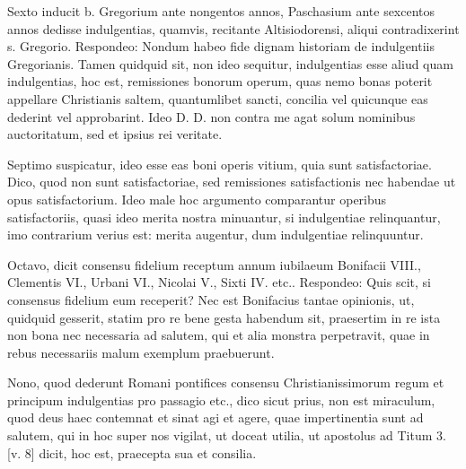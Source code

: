 Sexto inducit b. Gregorium ante nongentos annos, Paschasium ante sexcentos annos dedisse indulgentias, quamvis, recitante Altisiodorensi, aliqui contradixerint s. Gregorio. Respondeo: Nondum habeo fide dignam historiam de indulgentiis Gregorianis. Tamen quidquid sit, non ideo sequitur, indulgentias esse aliud quam indulgentias, hoc est, remissiones bonorum operum, quas nemo bonas poterit appellare Christianis saltem, quantumlibet sancti, concilia vel quicunque eas dederint vel approbarint. Ideo D. D. non contra me agat solum nominibus auctoritatum, sed et ipsius rei veritate.

Septimo suspicatur, ideo esse eas boni operis vitium, quia sunt satisfactoriae. Dico, quod non sunt satisfactoriae, sed remissiones satisfactionis nec habendae ut opus satisfactorium. Ideo male hoc argumento comparantur operibus satisfactoriis, quasi ideo merita nostra minuantur, si indulgentiae relinquantur, imo contrarium verius est: merita augentur, dum indulgentiae relinquuntur.

Octavo, dicit consensu fidelium receptum annum iubilaeum Bonifacii VIII., Clementis VI., Urbani VI., Nicolai V., Sixti IV. etc.. Respondeo: Quis scit, si consensus fidelium eum receperit? Nec est Bonifacius tantae opinionis, ut, quidquid gesserit, statim pro re bene gesta habendum sit, praesertim in re ista non bona nec necessaria ad salutem, qui et alia monstra perpetravit, quae in rebus necessariis malum exemplum praebuerunt.

Nono, quod dederunt Romani pontifices consensu Christianissimorum regum et principum indulgentias pro passagio etc., dico sicut prius, non est miraculum, quod deus haec contemnat et sinat agi et agere, quae impertinentia sunt ad salutem, qui in hoc super nos vigilat, ut doceat utilia, ut apostolus ad Titum 3. [v. 8] dicit, hoc est, praecepta sua et consilia.

